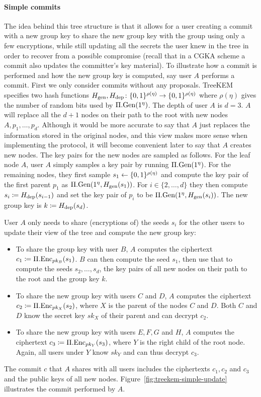\paragraph{Simple commits} \label{sec:simple-commit} The idea behind this tree structure is that it allows for a user creating a commit with a new group key to share the new group key with the group using only a few encryptions, while still updating all the secrets the user knew in the tree in order to recover from a possible compromise (recall that in a CGKA scheme a commit also updates the committer's key material).
To illustrate how a commit is performed and how the new group key is computed, say user $A$ performs a commit. First we only consider commits without any proposals. TreeKEM specifies two hash functions $H_\mathrm{gen}, H_\mathrm{dep} \colon \{0, 1\}^{\rho(\eta)} \to \{0, 1\}^{\rho(\eta)}$ where $\rho(\eta)$ gives the number of random bits used by $\Pi.\mathrm{Gen}(1^\eta)$. The depth of user $A$ is $d = 3$. $A$ will replace all the $d + 1$ nodes on their path to the root with new nodes $A, p_1, \ldots, p_d$. Although it would be more accurate to say that $A$ just replaces the information stored in the original nodes, and this view makes more sense when implementing the protocol, it will become convenient later to say that $A$ creates new nodes.
The key pairs for the new nodes are sampled as follows. For the leaf node $A$, user $A$ simply samples a key pair by running $\Pi.\mathrm{Gen}(1^\eta)$. For the remaining nodes, they first sample $s_1 \leftarrow \{0, 1\}^{\rho(\eta)}$ and compute the key pair of the first parent $p_1$ as $\Pi.\mathrm{Gen}(1^\eta, H_\mathrm{gen}(s_1))$. For $i \in \{2, \ldots, d\}$ they then compute $s_i \coloneqq H_\mathrm{dep}(s_{i - 1})$ and set the key pair of $p_i$ to be $\Pi.\mathrm{Gen}(1^\eta, H_\mathrm{gen}(s_i))$. The new group key is $k \coloneqq H_\mathrm{dep}(s_{d})$.

User $A$ only needs to share (encryptions of) the seeds $s_i$ for the other users to update their view of the tree and compute the new group key:
\begin{itemize}
	\item To share the group key with user $B$, $A$ computes the ciphertext $c_1 \coloneqq \Pi.\mathrm{Enc}_{pk_B}(s_1)$. $B$ can then compute the seed $s_1$, then use that to compute the seeds $s_2, \ldots, s_d$, the key pairs of all new nodes on their path to the root and the group key $k$.
	\item To share the new group key with users $C$ and $D$, $A$ computes the ciphertext $c_2 \coloneqq \Pi.\mathrm{Enc}_{pk_X}(s_2)$, where $X$ is the parent of the nodes $C$ and $D$. Both $C$ and $D$ know the secret key $sk_X$ of their parent and can decrypt $c_2$.
	\item To share the new group key with users $E, F, G$ and $H$, $A$ computes the ciphertext $c_3 \coloneqq \Pi.\mathrm{Enc}_{pk_Y}(s_3)$, where $Y$ is the right child of the root node. Again, all users under $Y$ know $sk_Y$ and can thus decrypt $c_3$.
\end{itemize}
The commit $c$ that $A$ shares with all users includes the ciphertexts $c_1, c_2$ and $c_3$ and the public keys of all new nodes. Figure~\ref{fig:treekem-simple-update} illustrates the commit performed by $A$.

